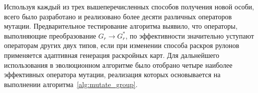 \documentclass[12pt]{article}
\begin{document}
Используя каждый из трех вышеперечисленных способов получения новой особи, 
всего было разработано и реализовано более десяти различных операторов мутации. 
Предварительное тестирование алгоритма выявило, что операторы, выполняющие 
преобразование $G_r \rightarrow G_r^*$, по эффективности значительно уступают 
операторам других двух типов, если при изменении способа раскроя рулонов 
применяется адаптивная генерация раскройных карт. Для дальнейшего использования 
в эволюционном алгоритме было отобрано четыре наиболее эффективных оператора 
мутации, реализация которых основывается на выполнении 
алгоритма~\ref{alg:mutate_group}. 
\end{document}
